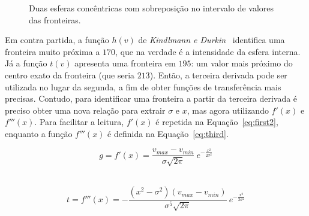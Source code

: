 \begin{figure}[h]
	\centering
	\caption{Duas esferas concêntricas com sobreposição no intervalo de valores das fronteiras.}
	\label{fig:m_double_sphere_disc}
\end{figure}
	
	Em contra partida, a função $ h(v) $ de \textit{Kindlmann e Durkin}~\cite{gordon} identifica uma fronteira muito próxima a $ 170 $, que na verdade é a intensidade da esfera interna. Já a função $ t(v) $ apresenta uma fronteira em $ 195 $: um valor mais próximo do centro exato da fronteira (que seria $ 213 $). Então, a terceira derivada pode ser utilizada no lugar da segunda, a fim de obter funções de transferência mais precisas. Contudo, para identificar uma fronteira a partir da terceira derivada é preciso obter uma nova relação para extrair $ \sigma $ e $ x $, mas agora utilizando $ f'(x) $ e $ f'''(x) $. Para facilitar a leitura, $ f'(x) $ é repetida na Equação~\eqref{eq:first2}, enquanto a função $ f'''(x) $ é definida na Equação~\eqref{eq:third}.
	
\begin{equation} \label{eq:first2}
g = f'(x) = \frac{v_{max} - v_{min}}{\sigma\sqrt{2\pi}}\ e^{-\frac{x^{2}}{2\sigma^{2}}}
\end{equation} \

\begin{equation} \label{eq:third}
t = f'''(x) = -\frac{(x^{2} - \sigma^{2})(v_{max} - v_{min})}{\sigma^{5}\sqrt{2\pi}}\ e^{-\frac{x^{2}}{2\sigma^{2}}}
\end{equation} \
	
